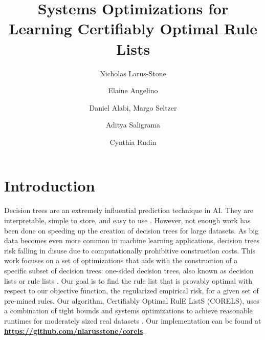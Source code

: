 \documentclass[format=sigconf]{acmart}
\begin{document}
\title{Systems Optimizations for Learning Certifiably Optimal Rule Lists}
\author{Nicholas Larus-Stone}

\author{Elaine Angelino}

\author{Daniel Alabi, Margo Seltzer}

\author{Aditya Saligrama}

\author{Cynthia Rudin}

\setlength{\abovedisplayskip}{3pt}
\setlength{\belowdisplayskip}{-10pt}
\setlength{\textfloatsep}{8pt}

\maketitle

\section{Introduction}
Decision trees are an extremely influential prediction technique in AI.
They are interpretable, simple to store, and easy to use \cite{BreimanFrOlSt84}.
However, not enough work has been done on speeding up the creation of decision trees for large datasets.
As big data becomes even more common in machine learning applications, decision trees risk falling in disuse due to computationally prohibitive construction costs.
This work focuses on a set of optimizations that aids with the construction of a specific subset of decision trees: one-sided decision trees, also known as decision lists or rule lists \cite{Rivest87}.
Our goal is to find the rule list that is provably optimal with respect to our objective function, the regularized empirical risk, for a given set of pre-mined rules.
Our algorithm, Certifiably Optimal RulE ListS (CORELS), uses a combination of tight bounds and systems optimizations to achieve reasonable runtimes for moderately sized real datasets \citep{AngelinoLaAlSeRu17-kdd, AngelinoLaAlSeRu17}. Our implementation can be found at \textbf{\url{https://github.com/nlarusstone/corels}}.
\end{document}
